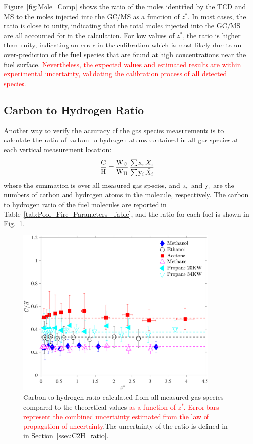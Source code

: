 \documentclass[12pt]{article}
\begin{document}
Figure~\ref{fig:Mole_Comp} shows the ratio of the moles identified by the TCD and MS to the moles injected into the GC/MS as a function of $z^*$. In most cases, the ratio is close to unity, indicating that the total moles injected into the GC/MS are all accounted for in the calculation. For low values of $z^*$, the ratio is higher than unity, indicating an error in the calibration which is most likely due to an over-prediction of the fuel species that are found at high concentrations near the fuel surface. \textcolor{red}{Nevertheless, the expected values and estimated results are within experimental uncertainty, validating the calibration process of all detected species.}

\subsection{Carbon to Hydrogen Ratio}

Another way to verify the accuracy of the gas species measurements is to calculate the ratio of carbon to hydrogen atoms contained in all gas species at each vertical measurement location:
\begin{equation}\label{eq:c2h_ratio}
  \frac{\rm C}{\rm H}= \frac{\textrm{W}_{\rm{C}}}{\textrm{W}_{\rm{H}}}\, \frac{ \sum  {\rm x}_i \, \bar{X}_{i}}{\sum {\rm y}_i \, \bar{X}_{i}}
\end{equation}
where the summation is over all measured gas species, and ${\rm x}_i$ and ${\rm y}_i$ are the numbers of carbon and hydrogen atoms in the molecule, respectively. The carbon to hydrogen ratio of the fuel molecules are reported in Table~\ref{tab:Pool_Fire_Parameters_Table}, and the ratio for each fuel is shown in Fig.~\ref{fig:C2H}.

\begin{figure}[h!]
	\centering
\includegraphics[width=10.0cm, keepaspectratio]{C2H_ratio_Comparison.pdf}
	\caption[Carbon to hydrogen ratio calculated from all species]{Carbon to hydrogen ratio calculated from all measured gas species compared to the theoretical values \textcolor{red}{ as a function of $z^*$. Error bars represent the combined uncertainty estimated from the law of propagation of uncertainty}.The uncertainty of the ratio is defined in in Section~\ref{ssec:C2H_ratio}.}
	\label{fig:C2H}
\end{figure}
\end{document}
